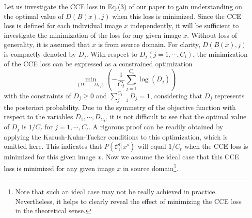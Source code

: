 \documentclass[10pt,twocolumn,letterpaper]{article}
\begin{document}
Let us investigate the CCE loss in Eq.(3) of our paper to gain understanding on the optimal value of $D(B(x),j)$ when this loss is minimized. Since the CCE loss is defined for each individual image $x$ independently, it will be sufficient to investigate the minimization of the loss for any given image $x$. Without loss of generality, it is assumed that $x$ is from source domain. For clarity, $D(B(x),j)$ is compactly denoted by $D_j$. With respect to $D_j (j=1,\cdots,C_t)$, the minimization of the CCE loss can be expressed as a constrained optimization 
\begin{equation}\label{eqn:opt}
\underset{\{D_1,\cdots,D_{C_t}\}}\min\left( -\frac{1}{C_{t}}\sum_{j=1}^{C_{t}}\log (D_j)  \right)
\end{equation} with the constraints of $D_j\geq{0}$ and $\sum_{j=1}^{C_{t}}D_j=1$, considering that $D_j$ represents the posteriori probability. Due to the symmetry of the objective function with respect to the variables $D_1,\cdots,D_{C_t}$, it is not difficult to see that the optimal value of $D_j$ is $1/C_t$ for $j=1,\cdots,C_t$. A rigorous proof can be readily obtained by applying the Karush-Kuhn-Tucker conditions to this optimization, which is omitted here. This indicates that $P(\mathcal{C}^t_i|x^s)$ will equal $1/C_t$ when the CCE loss is minimized for this given image $x$. Now we assume the ideal case that this CCE loss is minimized for any given image $x$ in source domain\footnote{Note that such an ideal case may not be really achieved in practice. Nevertheless, it helps to clearly reveal the effect of minimizing the CCE loss in the theoretical sense.}.   
\end{document}
